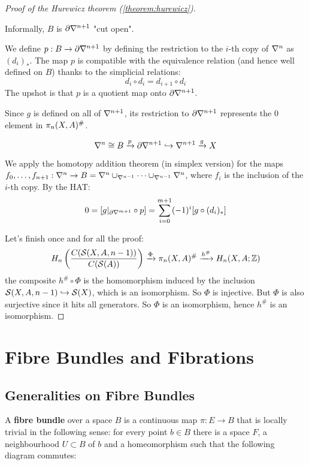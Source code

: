 \begin{proof}[Proof of the Hurewicz theorem (\ref{theorem:hurewicz})]
\begin{claimproof}
Informally, $B$ is $\partial\nabla^{n+1}$ "cut open".


We define $p:B\to\partial\nabla^{n+1}$ by defining the restriction to the $i$-th copy of $\nabla^n$ as $(d_i)_*$. The map $p$ is compatible with the equivalence relation (and hence well defined on $B$) thanks to the simplicial relations:
\[d_i\circ d_i=d_{i+1}\circ d_i\]
The upshot is that $p$ is a quotient map onto $\partial\nabla^{n+1}$.

Since $g$ is defined on all of $\nabla^{n+1}$, its restriction to $\partial\nabla^{n+1}$ represents the $0$ element in $\pi_n(X,A)^\#$.

\[\nabla^n\cong B\xrightarrow{p}\partial\nabla^{n+1}\hookrightarrow\nabla^{n+1}\xrightarrow{g}X\]

We apply the homotopy addition theorem (in simplex version) for the maps ${{f}_0,\dots,{f}_{n+1}}:\nabla^{n}\to B=\nabla^{n}\cup_{\nabla^{n-1}}\dots\cup_{\nabla^{n-1}}\nabla^{n}$, where $f_i$ is the inclusion of the $i$-th copy.
By the HAT:
\[0=[g|_{\partial \nabla^{m+1}}\circ p]=\sum_{i=0}^{m+1}(-1)^i[g\circ (d_i)_*]\]

\end{claimproof}

Let's finish once and for all the proof:
\[H_n\left(\frac{C(\mathcal{S}(X,A,n-1))}{C(\mathcal{S}(A))}\right)\xrightarrow{\Phi}\pi_n(X,A)^\#\xrightarrow{h^\#}H_n(X,A;{\mathbb Z})\]
the composite $h^\#\circ\Phi$ is the homomorphism induced by the inclusion $\mathcal{S}(X,A,n-1)\hookrightarrow \mathcal{S}(X)$, which is an isomorphism. So $\Phi$ is injective. But $\Phi$ is also surjective since it hits all generators. So $\Phi$ is an isomorphism, hence $h^\#$ is an isomorphism.
\end{proof}



\chapter{Fibre Bundles and Fibrations}

\section{Generalities on Fibre Bundles}

A \textbf{fibre bundle} over a space $B$ is a continuous map $\pi:E\to B$ that is locally trivial in the following sense: for every point $b\in B$ there is a space $F$, a neighbourhood $U\subset B$ of $b$ and a homeomorphism such that the following diagram commutes:
\begin{center}
\end{center}

